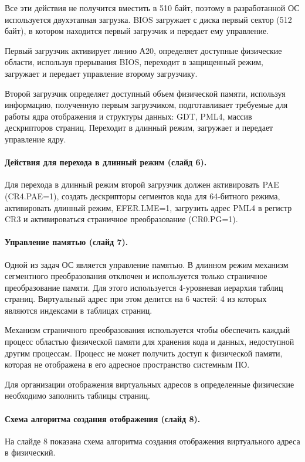 \documentclass[12pt]{article}
\begin{document}
Все эти действия не получится вместить в 510 байт, поэтому в разработанной ОС используется
двухэтапная загрузка. BIOS загружает с диска первый сектор (512 байт), в котором находится
первый загрузчик и передает ему управление.

Первый загрузчик активирует линию А20, определяет доступные физические области, используя
прерывания BIOS, переходит в защищенный режим, загружает и передает управление второму
загрузчику.

Второй загрузчик определяет доступный объем физической памяти, используя информацию, полученную
первым загрузчиком, подготавливает требуемые для работы ядра отображения и структуры данных:
GDT, PML4, массив дескрипторов страниц. Переходит в длинный режим, загружает и передает
управление ядру.

\paragraph{Действия для перехода в длинный режим (слайд 6).}
Для перехода в длинный режим второй загрузчик должен активировать PAE (CR4.PAE=1), создать
дескрипторы сегментов кода для 64-битного режима, активировать длинный режим, EFER.LME=1,
загрузить адрес PML4 в регистр CR3 и активироваться страничное преобразование (CR0.PG=1).

\paragraph{Управление памятью (слайд 7).}
Одной из задач ОС является управление памятью. В длинном режим механизм сегментного преобразования
отключен и используется только страничное преобразование памяти. Для этого используется 4-уровневая
иерархия таблиц страниц. Виртуальный адрес при этом делится на 6 частей: 4 из которых являются
индексами в таблицах страниц.

Механизм страничного преобразования используется чтобы обеспечить каждый процесс областью
физической памяти для хранения кода и данных, недоступной другим процессам. Процесс не может
получить доступ к физической памяти, которая не отображена в его адресное пространство системным ПО.

Для организации отображения виртуальных адресов в определенные физические необходимо заполнить
таблицы страниц.

\paragraph{Схема алгоритма создания отображения (слайд 8).}
На слайде 8 показана схема алгоритма создания отображения виртуального адреса в физический.
\end{document}
